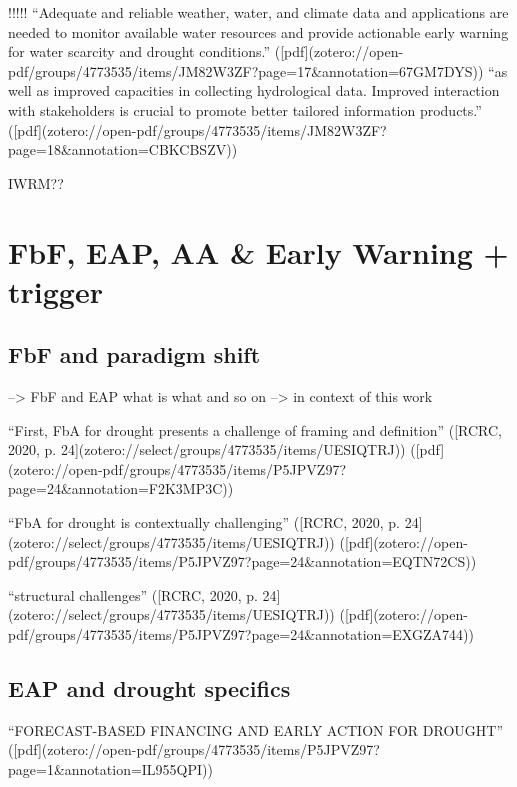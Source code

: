{!!!!!
“Adequate and reliable weather, water, and climate data and applications are needed to monitor available water resources and provide actionable early warning for water scarcity and drought conditions.” ([pdf](zotero://open-pdf/groups/4773535/items/JM82W3ZF?page=17&annotation=67GM7DYS))
“as well as improved capacities in collecting hydrological data. Improved interaction with stakeholders is crucial to promote better tailored information products.” ([pdf](zotero://open-pdf/groups/4773535/items/JM82W3ZF?page=18&annotation=CBKCBSZV))


IWRM??



\section{FbF, EAP, AA & Early Warning + trigger}

\subsection{FbF and paradigm shift}
--> FbF and EAP what is what and so on --> in context of this work


“First, FbA for drought presents a challenge of framing and definition” ([RCRC, 2020, p. 24](zotero://select/groups/4773535/items/UESIQTRJ)) ([pdf](zotero://open-pdf/groups/4773535/items/P5JPVZ97?page=24&annotation=F2K3MP3C))

“FbA for drought is contextually challenging” ([RCRC, 2020, p. 24](zotero://select/groups/4773535/items/UESIQTRJ)) ([pdf](zotero://open-pdf/groups/4773535/items/P5JPVZ97?page=24&annotation=EQTN72CS))

“structural challenges” ([RCRC, 2020, p. 24](zotero://select/groups/4773535/items/UESIQTRJ)) ([pdf](zotero://open-pdf/groups/4773535/items/P5JPVZ97?page=24&annotation=EXGZA744))


\subsection{EAP and drought specifics}
“FORECAST-BASED FINANCING AND EARLY ACTION FOR DROUGHT” ([pdf](zotero://open-pdf/groups/4773535/items/P5JPVZ97?page=1&annotation=IL955QPI))

}
